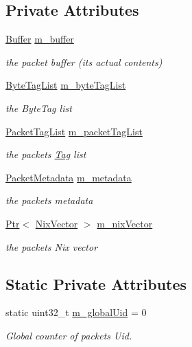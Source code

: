 \subsection*{Private Attributes}
\begin{DoxyCompactItemize}
\item 
\hyperlink{classns3_1_1Buffer}{Buffer} \hyperlink{classns3_1_1Packet_a0f17bc9b4177865c9fe48fc927d57996}{m\+\_\+buffer}
\begin{DoxyCompactList}\small\item\em the packet buffer (it\textquotesingle{}s actual contents) \end{DoxyCompactList}\item 
\hyperlink{classns3_1_1ByteTagList}{Byte\+Tag\+List} \hyperlink{classns3_1_1Packet_a29e08c3cc4220a80366eea801c00e4ba}{m\+\_\+byte\+Tag\+List}
\begin{DoxyCompactList}\small\item\em the Byte\+Tag list \end{DoxyCompactList}\item 
\hyperlink{classns3_1_1PacketTagList}{Packet\+Tag\+List} \hyperlink{classns3_1_1Packet_a7c91fc548c7cfddf27c176e13bd858ff}{m\+\_\+packet\+Tag\+List}
\begin{DoxyCompactList}\small\item\em the packet\textquotesingle{}s \hyperlink{classns3_1_1Tag}{Tag} list \end{DoxyCompactList}\item 
\hyperlink{classns3_1_1PacketMetadata}{Packet\+Metadata} \hyperlink{classns3_1_1Packet_af3f95fba7966191bd152bcedd5fbcd6b}{m\+\_\+metadata}
\begin{DoxyCompactList}\small\item\em the packet\textquotesingle{}s metadata \end{DoxyCompactList}\item 
\hyperlink{classns3_1_1Ptr}{Ptr}$<$ \hyperlink{classns3_1_1NixVector}{Nix\+Vector} $>$ \hyperlink{classns3_1_1Packet_af6fe17f2fb778ccd84af5c3c950ee4f4}{m\+\_\+nix\+Vector}
\begin{DoxyCompactList}\small\item\em the packet\textquotesingle{}s Nix vector \end{DoxyCompactList}\end{DoxyCompactItemize}
\subsection*{Static Private Attributes}
\begin{DoxyCompactItemize}
\item 
static uint32\+\_\+t \hyperlink{classns3_1_1Packet_a4f707aab2b31689f8d1dadaed31e7c82}{m\+\_\+global\+Uid} = 0
\begin{DoxyCompactList}\small\item\em Global counter of packets Uid. \end{DoxyCompactList}\end{DoxyCompactItemize}


